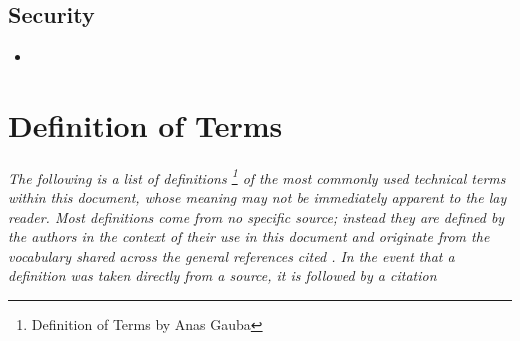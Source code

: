 \documentclass[12pt]{article}
\begin{document}
	\subsection{Security}
	\begin{itemize}
		\item 
	\end{itemize}


\section{Definition of Terms} \label{defs} %
	\paragraph{} \textit{The following is a list of definitions \footnote{Definition of Terms by Anas Gauba} of the most commonly 
	used technical terms within this document, whose meaning may not be immediately 
	apparent to the lay reader. Most definitions come from no specific source; instead 
	they are defined by the authors in the context of their use in this document and 
	originate from the vocabulary shared across the general references cited \nocite{*}. In 
	the event that a definition was taken directly from a source, it is followed by a 
	citation}
	
\end{document}
